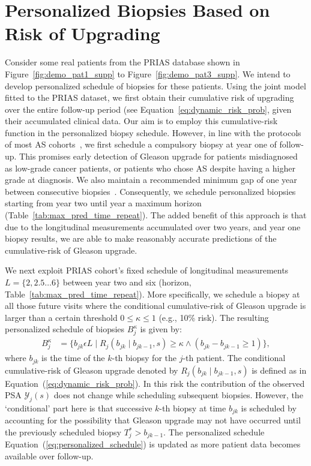 \section{Personalized Biopsies Based on Risk of Upgrading}
Consider some real patients from the PRIAS database shown in Figure~\ref{fig:demo_pat1_supp} to Figure~\ref{fig:demo_pat3_supp}. We intend to develop personalized schedule of biopsies for these patients. Using the joint model fitted to the PRIAS dataset, we first obtain their cumulative risk of upgrading over the entire follow-up period (see Equation~\ref{eq:dynamic_risk_prob}, given their accumulated clinical data. Our aim is to employ this cumulative-risk function in the personalized biopsy schedule. However, in line with the protocols of most AS cohorts~\citep{nieboer2018active}, we first schedule a compulsory biopsy at year one of follow-up. This promises early detection of Gleason upgrade for patients misdiagnosed as low-grade cancer patients, or patients who chose AS despite having a higher grade at diagnosis. We also maintain a recommended minimum gap of one year between consecutive biopsies~\citep{bokhorst2015compliance}. Consequently, we schedule personalized biopsies starting from year two until year a maximum horizon (Table~\ref{tab:max_pred_time_repeat}). The added benefit of this approach is that due to the longitudinal measurements accumulated over two years, and year one biopsy results, we are able to make reasonably accurate predictions of the cumulative-risk of Gleason upgrade. 

We next exploit PRIAS cohort's fixed schedule of longitudinal measurements ${L=\{2, 2.5 \ldots 6\}}$ between year two and six (horizon, Table~\ref{tab:max_pred_time_repeat}). More specifically, we schedule a biopsy at all those future visits where the conditional cumulative-risk of Gleason upgrade is larger than a certain threshold $0 \leq \kappa \leq 1$ (e.g., 10\% risk). The resulting personalized schedule of biopsies $B_j^{\kappa}$ is given by:
\begin{equation}
\label{eq:personalized_schedule}
\begin{split}
B_j^{\kappa} &= \Big\{b_{jk} \epsilon L \mid R_j(b_{jk} \mid b_{jk-1}, s) \geq \kappa \land (b_{jk}-b_{jk-1}\geq 1) \Big\},
\end{split}
\end{equation}
where $b_{jk}$ is the time of the $k$-th biopsy for the $j$-th patient. The conditional cumulative-risk of Gleason upgrade denoted by $R_j(b_{jk} \mid b_{jk-1}, s)$ is defined as in Equation~(\ref{eq:dynamic_risk_prob}). In this risk the contribution of the observed PSA $\mathcal{Y}_{j}(s)$ does not change while scheduling subsequent biopsies. However, the `conditional' part here is that successive $k$-th biopsy at time $b_{jk}$ is scheduled by accounting for the possibility that Gleason upgrade may not have occurred until the previously scheduled biopsy $T^*_j > b_{jk-1}$. The personalized schedule Equation~(\ref{eq:personalized_schedule}) is updated as more patient data becomes available over follow-up.

